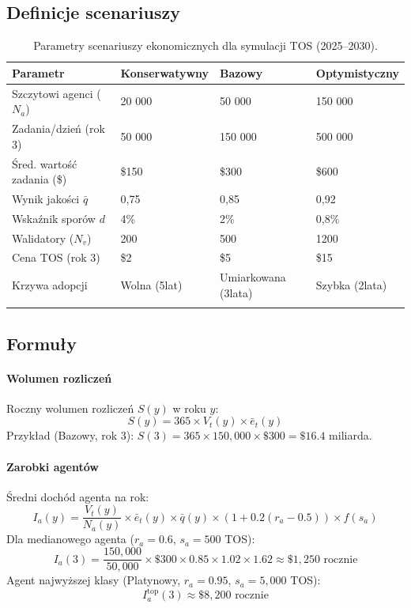 \documentclass[11pt]{article}
\begin{document}
\subsection{Definicje scenariuszy}
\begin{longtable}{@{}p{}p{}p{}p{}@{}}
\toprule
\textbf{Parametr} & \textbf{Konserwatywny} & \textbf{Bazowy} & \textbf{Optymistyczny} \\\midrule
Szczytowi agenci ($N_a$) & 20 000 & 50 000 & 150 000 \\
Zadania/dzień (rok 3) & 50 000 & 150 000 & 500 000 \\
Śred. wartość zadania (\$) & \$150 & \$300 & \$600 \\
Wynik jakości $\bar{q}$ & 0,75 & 0,85 & 0,92 \\
Wskaźnik sporów $d$ & 4\% & 2\% & 0,8\% \\
Walidatory ($N_v$) & 200 & 500 & 1200 \\
Cena TOS (rok 3) & \$2 & \$5 & \$15 \\
Krzywa adopcji & Wolna (5lat) & Umiarkowana (3lata) & Szybka (2lata) \\\bottomrule
\caption{Parametry scenariuszy ekonomicznych dla symulacji TOS (2025--2030).}
\label{tab:econ-scenarios}
\end{longtable}

\subsection{Formuły}
\paragraph{Wolumen rozliczeń} Roczny wolumen rozliczeń $S(y)$ w roku $y$:
\begin{equation}
S(y) = 365 \times V_t(y) \times \bar{e}_t(y)
\end{equation}
Przykład (Bazowy, rok 3): $S(3) = 365 \times 150{,}000 \times \$300 = \$16.4$ miliarda.

\paragraph{Zarobki agentów} Średni dochód agenta na rok:
\begin{equation}
I_a(y) = \frac{V_t(y)}{N_a(y)} \times \bar{e}_t(y) \times \bar{q}(y) \times (1 + 0.2(r_a - 0.5)) \times f(s_a)
\end{equation}
Dla medianowego agenta ($r_a = 0.6$, $s_a = 500$ TOS):
\begin{equation}
I_a(3) = \frac{150{,}000}{50{,}000} \times \$300 \times 0.85 \times 1.02 \times 1.62 \approx \$1{,}250 \text{ rocznie}
\end{equation}
Agent najwyższej klasy (Platynowy, $r_a = 0.95$, $s_a = 5{,}000$ TOS):
\begin{equation}
I_a^{\text{top}}(3) \approx \$8{,}200 \text{ rocznie}
\end{equation}
\end{document}
